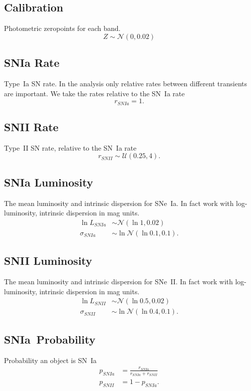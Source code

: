 \documentclass[preprint,3p]{elsarticle}
\begin{document}
\subsection{Calibration}
Photometric zeropoints for each band.
\begin{equation}
Z \sim \mathcal{N}(0,0.02)
\end{equation}

\subsection{SNIa Rate}
Type~Ia SN rate. In the analysis only relative rates between different transients are important.
We take the rates relative to the SN~Ia rate
\begin{equation}
r_{SNIa} = 1.
\end{equation}

\subsection{SNII Rate}
Type~II SN rate, relative to the SN~Ia rate
\begin{equation}
r_{SNII} \sim \mathcal{U}(0.25, 4).
\end{equation}

\subsection{SNIa Luminosity}
The mean luminosity and intrinsic dispersion for SNe~Ia. In fact work with log-luminosity, intrinsic
dispersion in mag units.
\begin{align}
\ln{L}_{SNIa} & \sim \mathcal{N}(\ln{1}, 0.02) \\
\sigma_{SNIa} & \sim \ln{\mathcal{N}}(\ln{0.1},0.1).
\end{align}

\subsection{SNII Luminosity}
The mean luminosity and intrinsic dispersion for SNe~II. In fact work with log-luminosity, intrinsic
dispersion in mag units.
\begin{align}
\ln{L}_{SNII} & \sim \mathcal{N}(\ln{0.5}, 0.02) \\
\sigma_{SNII} & \sim \ln{\mathcal{N}}(\ln{0.4},0.1).
\end{align}

\subsection{SNIa~Probability}
Probability an object is SN~Ia
\begin{align}
p_{SNIa} &= \frac{r_{SNIa}}{r_{SNIa}+r_{SNII}} \nonumber \\
p_{SNII}&=1-p_{SNIa}.
\label{prob:eqn}
\end{align}
\end{document}
